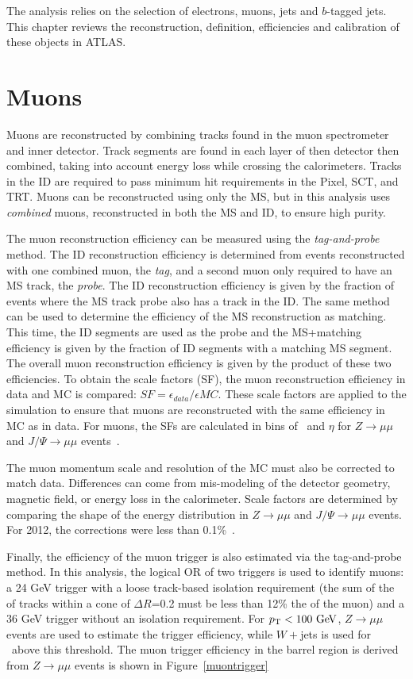 
The analysis relies on the selection of electrons, muons, jets and $b$-tagged jets. This chapter reviews the reconstruction, definition, efficiencies and calibration of these objects in ATLAS.

\section{Muons}
Muons are reconstructed by combining tracks found in the muon spectrometer and inner detector. Track segments are found in each layer of then detector then combined, taking into account energy loss while crossing the calorimeters. Tracks in the ID are required to pass minimum hit requirements in the Pixel, SCT, and TRT. Muons can be reconstructed using only the MS, but in this analysis uses \emph{combined} muons, reconstructed in both the MS and ID, to ensure high purity.

The muon reconstruction efficiency can be measured using the \emph{tag-and-probe} method. The ID reconstruction efficiency is determined from events reconstructed with one combined muon, the \emph{tag}, and a second muon only required to have an MS track, the \emph{probe}. The ID reconstruction efficiency is given by the fraction of events where the MS track probe also has a track in the ID. The same method can be used to determine the efficiency of the MS reconstruction as matching. This time, the ID segments are used as the probe and the MS+matching efficiency is given by the fraction of ID segments with a matching MS segment. The overall muon reconstruction efficiency is given by the product of these two efficiencies. To obtain the scale factors (SF), the muon reconstruction efficiency in data and MC is compared: $SF = \epsilon_{data}/\epsilon{MC}$. These scale factors are applied to the simulation to ensure that muons are reconstructed with the same efficiency in MC as in data. For muons, the SFs are calculated in bins of \pt\ and $\eta$ for $Z\rightarrow \mu\mu$ and $J/\Psi\rightarrow \mu\mu$ events~\cite{muonpaper}. 

The muon momentum scale and resolution of the MC must also be corrected to match data. Differences can come from mis-modeling of the detector geometry, magnetic field, or energy loss in the calorimeter. Scale factors are determined by comparing the shape of the energy distribution in $Z\rightarrow \mu\mu$ and $J/\Psi\rightarrow \mu\mu$ events. For 2012, the corrections were less than 0.1\%~\cite{muonpaper}.

Finally, the efficiency of the muon trigger is also estimated via the tag-and-probe method. In this analysis, the logical OR of two triggers is used to identify muons: a 24 GeV trigger with a loose track-based isolation requirement (the sum of the \pt of tracks within a cone of $\Delta R$=0.2 must be less than 12\% the \pt of the muon) and a 36 GeV trigger without an isolation requirement. For $\pt<100 \gev$, $Z\rightarrow\mu\mu$ events are used to estimate the trigger efficiency, while $W+$jets is used for \pt\ above this threshold. The muon trigger efficiency in the barrel region is derived from $Z\rightarrow\mu\mu$ events is shown in Figure~\ref{muontrigger}


